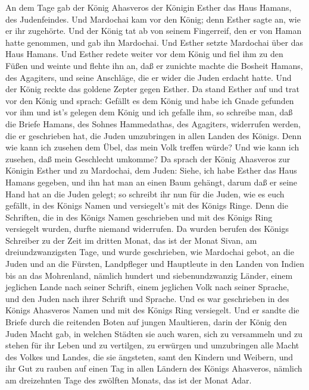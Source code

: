  An dem Tage gab der König Ahasveros der Königin Esther das
Haus Hamans, des Judenfeindes. Und Mardochai kam vor den König; denn
Esther sagte an, wie er ihr zugehörte.  Und der König tat ab
von seinem Fingerreif, den er von Haman hatte genommen, und gab ihn
Mardochai. Und Esther setzte Mardochai über das Haus Hamans.
 Und Esther redete weiter vor dem König und fiel ihm zu den
Füßen und weinte und flehte ihn an, daß er zunichte machte die Bosheit
Hamans, des Agagiters, und seine Anschläge, die er wider die Juden
erdacht hatte.  Und der König reckte das goldene Zepter
gegen Esther. Da stand Esther auf und trat vor den König 
und sprach: Gefällt es dem König und habe ich Gnade gefunden vor ihm und
ist's gelegen dem König und ich gefalle ihm, so schreibe man, daß die
Briefe Hamans, des Sohnes Hammedathas, des Agagiters, widerrufen werden,
die er geschrieben hat, die Juden umzubringen in allen Landen des
Königs.  Denn wie kann ich zusehen dem Übel, das mein Volk
treffen würde? Und wie kann ich zusehen, daß mein Geschlecht umkomme?
 Da sprach der König Ahasveros zur Königin Esther und zu
Mardochai, dem Juden: Siehe, ich habe Esther das Haus Hamans gegeben,
und ihn hat man an einen Baum gehängt, darum daß er seine Hand hat an
die Juden gelegt;  so schreibt ihr nun für die Juden, wie es
euch gefällt, in des Königs Namen und versiegelt's mit des Königs Ringe.
Denn die Schriften, die in des Königs Namen geschrieben und mit des
Königs Ring versiegelt wurden, durfte niemand widerrufen. 
Da wurden berufen des Königs Schreiber zu der Zeit im dritten Monat, das
ist der Monat Sivan, am dreiundzwanzigsten Tage, und wurde geschrieben,
wie Mardochai gebot, an die Juden und an die Fürsten, Landpfleger und
Hauptleute in den Landen von Indien bis an das Mohrenland, nämlich
hundert und siebenundzwanzig Länder, einem jeglichen Lande nach seiner
Schrift, einem jeglichen Volk nach seiner Sprache, und den Juden nach
ihrer Schrift und Sprache.  Und es war geschrieben in des
Königs Ahasveros Namen und mit des Königs Ring versiegelt. Und er sandte
die Briefe durch die reitenden Boten auf jungen Maultieren,
 darin der König den Juden Macht gab, in welchen Städten
sie auch waren, sich zu versammeln und zu stehen für ihr Leben und zu
vertilgen, zu erwürgen und umzubringen alle Macht des Volkes und Landes,
die sie ängsteten, samt den Kindern und Weibern, und ihr Gut zu rauben
 auf einen Tag in allen Ländern des Königs Ahasveros,
nämlich am dreizehnten Tage des zwölften Monats, das ist der Monat Adar.

